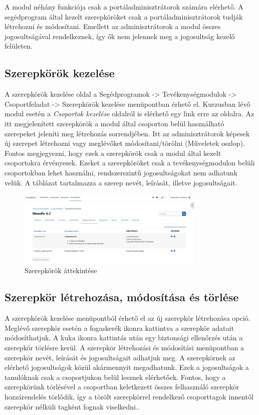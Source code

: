A modul néhány funkciója csak a portáladminisztrátorok számára elérhető. A segédprogram által kezelt szerepköröket csak a portáladminisztrátorok tudják létrehozni és módosítani. Emellett az adminisztrátorok a modul összes jogosultságával rendelkeznek, így ők nem jelennek meg a jogosultság kezelő felületen.

\subsection{Szerepkörök kezelése}

A szerepkörök kezelése oldal a Segédprogramok -> Tevékenységmodulok -> Csoportfeladat -> Szerepkörök kezelése menüpontban érhető el. Kurzusban lévő modul esetén a \textit{Csoportok kezelése} oldalról is elérhető egy link erre az oldalra. Az itt megjelenített szerepkörök a modul által csoporton belül használható szerepeket jeleníti meg létrehozás sorrendjében. Itt az adminisztrátorok képesek új szerepet létrehozni vagy meglévőket módosítani/törölni (Műveletek oszlop). Fontos megjegyezni, hogy ezek a szerepkörök csak a modul által kezelt csoportokra érvényesek. Ezeket a szerepköröket csak a tevékenységmodulon belüli csoportokban lehet használni, rendszerszintű jogosultságokat nem adhatunk velük. A táblázat tartalmazza a szerep nevét, leírását, illetve jogosultságait.

\begin{figure}[H]
	\centering
	\includegraphics[width=0.8\textwidth,frame]{images/szerepkorok_kezelese.png}
	\caption{Szerepkörök áttekintése}
\end{figure}

\subsection{Szerepkör létrehozása, módosítása és törlése  }

A szerepkörök kezelése menüpontból érhető el az új szerepkör létrehozása opció. Meglévő szerepkör esetén a fogaskerék ikonra kattintva a szerepkör adatait módosíthatjuk. A kuka ikonra kattintás után egy biztonsági ellenőrzés után a szerepkör törlésre kerül. A szerepkör létrehozási és módosítási menüpontban a szerepkör nevét, leírását és jogosultságait adhatjuk meg. A szerepkörnek az elérhető jogosultságok közül akármennyit megadhatunk. Ezek a jogosultságok a tanulóknak csak a csoportjukon belül lesznek elérhetőek. Fontos, hogy a szerepkörünk törlésével a csoportban keletkezett összes felhasználó szerepkör hozzárendelés törlődik, így a törölt szerepkörrel rendelkező csoporttagok innentől szerepkör nélküli tagként fognak viselkedni..

